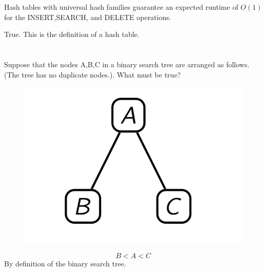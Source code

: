 \documentclass [12pt]{article}
\begin{document}
\section{} Hash tables with universal hash families guarantee an expected runtime of $O(1)$ for the INSERT,SEARCH, and DELETE operations. 

\begin{Solution}
True. This is the definition of a hash table.
\end{Solution}


\section{} Suppose that the nodes A,B,C in a binary search tree are arranged as follows. (The tree has no duplicate nodes.). What must be true?
\begin{figure}[H]
    \centering
    \includegraphics[scale=0.5]{pic1.png} 
    \label{fig:my_label}
\end{figure}

\begin{Solution}
$$B < A < C$$
By definition of the binary search tree.
\end{Solution}
\end{document}
